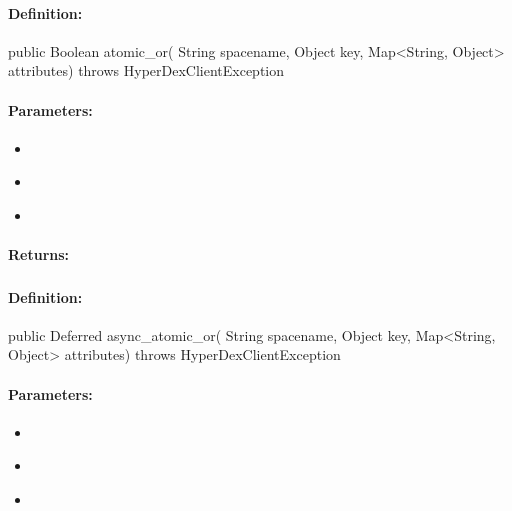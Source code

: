 \paragraph{Definition:}
\begin{javacode}
public Boolean atomic_or(
        String spacename,
        Object key,
        Map<String, Object> attributes) throws HyperDexClientException
\end{javacode}

\paragraph{Parameters:}
\begin{itemize}[noitemsep]
\item {}\\

\item {}\\

\item {}\\

\end{itemize}

\paragraph{Returns:}


\pagebreak
\subsubsection{}
\label{api:java:async_atomic_or}


\paragraph{Definition:}
\begin{javacode}
public Deferred async_atomic_or(
        String spacename,
        Object key,
        Map<String, Object> attributes) throws HyperDexClientException
\end{javacode}

\paragraph{Parameters:}
\begin{itemize}[noitemsep]
\item {}\\

\item {}\\

\item {}\\

\end{itemize}

